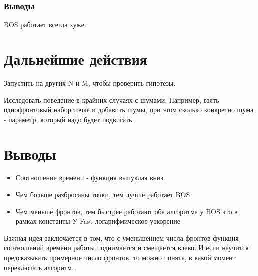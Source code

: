\subsubsection{Выводы}
BOS работает всегда хуже.


\section{Дальнейшие действия}
Запустить на других N и M, чтобы проверить гипотезы. 

Исследовать поведение в крайних случаях с шумами. Например, взять однофронтовый набор точке и добавить шумы, при этом сколько конкретно шума - параметр, который надо будет подвигать. 


\section{Выводы}
\begin{itemize}
	\item Соотношение времени - функция выпуклая вниз. 
	\item Чем больше разбросаны точки, тем лучше работает BOS
	\item Чем меньше фронтов, тем быстрее работают оба алгоритма
	\subitem у BOS это в рамках константы
	\subitem У Fast логарифмическое ускорение
\end{itemize}

Важная идея заключается в том, что с уменьшением числа фронтов функция соотношений времени работы поднимается и смещается влево. И если научится предсказывать примерное число фронтов, то можно понять, в какой момент переключать алгоритм. 